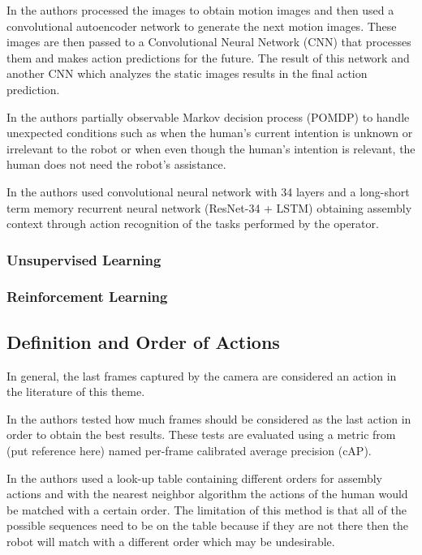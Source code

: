 In \cite{Rodriguez2019} the authors processed the images to obtain motion images and then used a convolutional autoencoder network to generate the next motion images. These images are then passed to a Convolutional Neural Network (CNN) that processes them and makes action predictions for the future. The result of this network and another CNN which analyzes the static images results in the final action prediction.

In \cite{Gorur2018} the authors partially observable Markov decision process (POMDP) to handle unexpected conditions such as when the human’s current intention is unknown or irrelevant to the robot or when even though the human’s intention is relevant, the human does not need the robot’s assistance.

In \cite{Moutinho2023} the authors used convolutional neural network with 34 layers and a long-short term memory recurrent neural network (ResNet-34 + LSTM) obtaining assembly context through action recognition of the tasks performed by the operator.

\subsubsection{Unsupervised Learning}

\subsubsection{Reinforcement Learning}

\subsection{Definition and Order of Actions}

In general, the last frames captured by the camera are considered an action in the literature of this theme.

In \cite{Wang2021} the authors tested how much frames should be considered as the last action in order to obtain the best results. These tests are evaluated using a metric from {\color{red} (put reference here)} named per-frame calibrated average precision (cAP).

In \cite{Maeda2016} the authors used a look-up table containing different orders for assembly actions and with the nearest neighbor algorithm the actions of the human would be matched with a certain order. The limitation of this method is that all of the possible sequences need to be on the table because if they are not there then the robot will match with a different order which may be undesirable.


